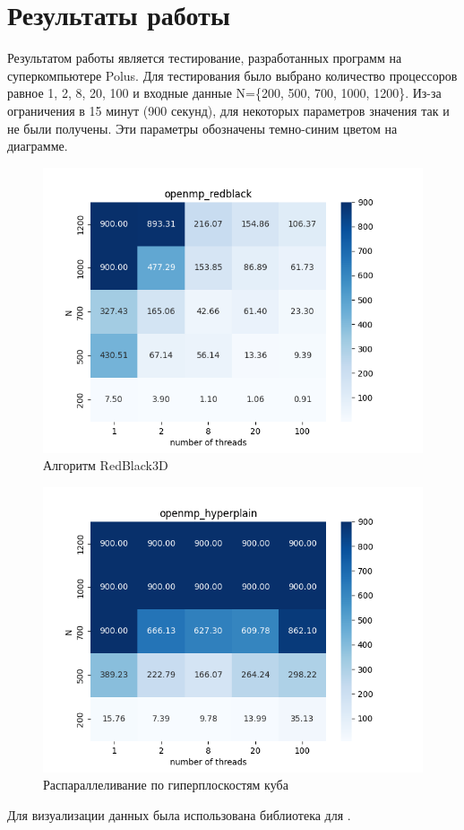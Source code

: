 \section{Результаты работы}

Результатом работы является тестирование, разработанных программ на суперкомпьютере Polus. Для тестирования было выбрано количество процессоров равное 1, 2, 8, 20, 100 и входные данные N=\{200, 500, 700, 1000, 1200\}.
Из-за ограничения в 15 минут (900 секунд), для некоторых параметров значения так и не были получены. Эти параметры обозначены темно-синим цветом на диаграмме.


\begin{figure}[H]
    \centering
\includegraphics[width=1.\linewidth,center]{openmp_redblack.png}
    \caption{Алгоритм RedBlack3D}
\end{figure}

\begin{figure}[H]
    \centering
\includegraphics[width=1.\linewidth,center]{openmp_hyperplain.png}
    \caption{Распараллеливание по гиперплоскостям куба}
\end{figure}

Для визуализации данных была использована библиотека  для .

